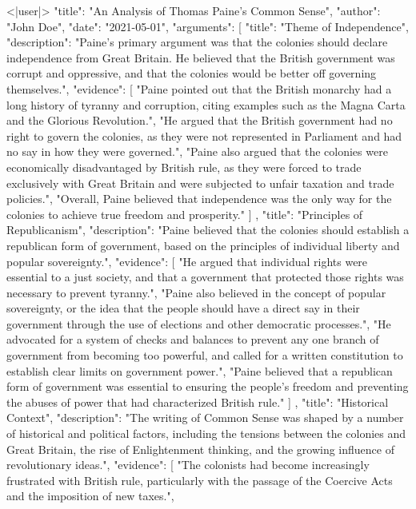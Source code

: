 \documentclass{article}
\begin{document}
\begin{tcolorbox}[colframe=black,colback=white]
<|user|>
{
  "title": "An Analysis of Thomas Paine's Common Sense",
  "author": "John Doe",
  "date": "2021-05-01",
  "arguments": [
    {
      "title": "Theme of Independence",
      "description": "Paine's primary argument was that the colonies should declare independence from Great Britain. He believed that the British government was corrupt and oppressive, and that the colonies would be better off governing themselves.",
      "evidence": [
        "Paine pointed out that the British monarchy had a long history of tyranny and corruption, citing examples such as the Magna Carta and the Glorious Revolution.",
        "He argued that the British government had no right to govern the colonies, as they were not represented in Parliament and had no say in how they were governed.",
        "Paine also argued that the colonies were economically disadvantaged by British rule, as they were forced to trade exclusively with Great Britain and were subjected to unfair taxation and trade policies.",
        "Overall, Paine believed that independence was the only way for the colonies to achieve true freedom and prosperity."
      ]
    },
    {
      "title": "Principles of Republicanism",
      "description": "Paine believed that the colonies should establish a republican form of government, based on the principles of individual liberty and popular sovereignty.",
      "evidence": [
        "He argued that individual rights were essential to a just society, and that a government that protected those rights was necessary to prevent tyranny.",
        "Paine also believed in the concept of popular sovereignty, or the idea that the people should have a direct say in their government through the use of elections and other democratic processes.",
        "He advocated for a system of checks and balances to prevent any one branch of government from becoming too powerful, and called for a written constitution to establish clear limits on government power.",
        "Paine believed that a republican form of government was essential to ensuring the people's freedom and preventing the abuses of power that had characterized British rule."
      ]
    },
    {
      "title": "Historical Context",
      "description": "The writing of Common Sense was shaped by a number of historical and political factors, including the tensions between the colonies and Great Britain, the rise of Enlightenment thinking, and the growing influence of revolutionary ideas.",
      "evidence": [
        "The colonists had become increasingly frustrated with British rule, particularly with the passage of the Coercive Acts and the imposition of new taxes.",
}}
\end{tcolorbox}
\end{document}
